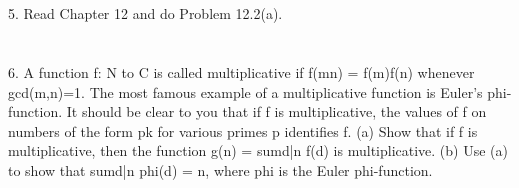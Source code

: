 \documentclass[letterpaper, 12pt, oneside]{memoir}
\theoremstyle{mystyle}
\begin{document}
\section{} 
5. Read Chapter 12 and do Problem 12.2(a). 
\section{} 
6. A function f: N to C is called multiplicative if f(mn) = f(m)f(n) whenever gcd(m,n)=1. The most famous example of a multiplicative function is Euler's phi-function. It should be clear to you that if f is multiplicative, the values of f on numbers of the form pk for various primes p identifies f. 
(a) Show that if f is multiplicative, then the function g(n) = sumd|n f(d) is multiplicative. 
(b) Use (a) to show that sumd|n phi(d) = n, where phi is the Euler phi-function. 
\end{document}
